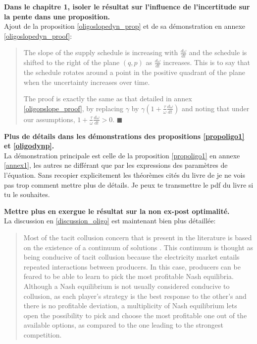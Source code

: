 \documentclass{article}
\newenvironment{proof}[1][Proof]{\begin{trivlist}
\item[\hskip \labelsep {\bfseries #1}]}{\end{trivlist}}
\newcommand{\qed}{$\blacksquare$}
\begin{document}
\begin{itemize}

\item \textbf{Dans le chapitre 1, isoler le résultat sur l'influence de l'incertitude sur la pente dans une proposition.}\\

Ajout de la proposition \ref{oligoslopedyn_prop} et de sa démonstration en annexe \ref{oligoslopedyn_proof}:

\begin{quote}
The slope of the supply schedule is increasing with $\frac{d\omega}{dt}$ and the schedule is shifted to the right of the plane $(q,p)$ as $\frac{d\omega}{dt}$ increases. This is to say that the schedule rotates around a point in the positive quadrant of the plane when the uncertainty increases over time. 
\begin{proof}
The proof is exactly the same as that detailed in annex \ref{oligopslope_proof}, by replacing $\gamma$ by $\gamma(1+\frac{\tau}{\omega}\frac{d\omega}{dt})$ and noting that under our assumptions, $1+\frac{\tau}{\omega}\frac{d\omega}{dt}>0$. \qed
\end{proof}
\end{quote}

\item \textbf{Plus de détails dans les démonstrations des propositions \ref{propoligo1} et \ref{oligodynp}.}\\

La démonstration principale est celle de la proposition \ref{propoligo1} en annexe \ref{annex1}, les autres ne différant que par les expressions des paramètres de l'équation. Sans recopier explicitement les théorèmes cités du livre de \cite{constraint} je ne vois pas trop comment mettre plus de détails. Je peux te transmettre le pdf du livre si tu le souhaites.

\item \textbf{Mettre plus en exergue le résultat sur la non ex-post optimalité.}\\

La discussion en \ref{discussion_oligo} est maintenant bien plus détaillée:

\begin{quote}
Most of the tacit collusion concern that is present in the literature is based on the existence of a continuum of solutions \cite{bolle1992supply}. This continuum is thought as being conducive of tacit collusion because the electricity market entails repeated interactions between producers. In this case, producers can be feared to be able to learn to pick the most profitable Nash equilibria. Although a Nash equilibrium is not usually considered conducive to collusion, as each player's strategy is the best response to the other's and there is no profitable deviation, a multiplicity of Nash equilibrium lets open the possibility to pick and choose the most profitable one out of the available options, as compared to the one leading to the strongest competition.\\


\end{quote}
\end{itemize}
\end{document}
